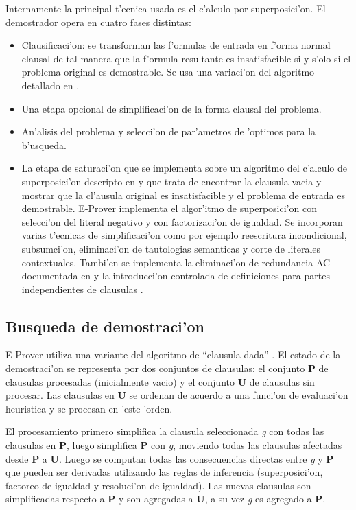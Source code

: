 Internamente la principal t'ecnica usada es el c'alculo por superposici'on. El demostrador opera en cuatro fases distintas:
\begin{itemize}
\item Clausificaci'on: se transforman las f'ormulas de entrada en f'orma normal clausal de tal manera que la f'ormula resultante es insatisfacible si y s'olo si el problema original es demostrable. Se usa una variaci'on del algoritmo detallado en \cite{smallcnf2001}.

\item Una etapa opcional de simplificaci'on de la forma clausal del problema.

\item An'alisis del problema y selecci'on de par'ametros de 'optimos para la b'usqueda.

\item La etapa de saturaci'on que se implementa sobre un algoritmo del c'alculo de superposici'on descripto en \cite{bg94} y \cite{aicom2002} que trata de encontrar la clausula vacia y mostrar que la cl'ausula original es insatisfacible y el problema de entrada es demostrable. E-Prover implementa el algor'itmo de superposici'on con selecci'on del literal negativo y con factorizaci'on de igualdad. Se incorporan varias t'ecnicas de simplificaci'on como por ejemplo reescritura incondicional, subsumci'on, eliminaci'on de tautologias semanticas y corte de literales contextuales. Tambi'en se implementa la eliminaci'on de redundancia AC documentada en \cite{jsc2003} y la introducci'on controlada de definiciones para partes independientes de clausulas \cite{ijcai2001}.
\end{itemize}

\subsection{Busqueda de demostraci'on}

E-Prover utiliza una variante del algoritmo de ``clausula dada'' \cite{dk97}. El estado de la demostraci'on se representa por dos conjuntos de clausulas: el conjunto \textbf{P} de clausulas procesadas (inicialmente vacio) y el conjunto \textbf{U} de clausulas sin procesar. Las clausulas en \textbf{U} se ordenan de acuerdo a una funci'on de evaluaci'on heuristica y se procesan en 'este 'orden.

El procesamiento primero simplifica la clausula seleccionada \textit{g} con todas las clausulas en \textbf{P}, luego simplifica \textbf{P} con \textit{g}, moviendo todas las clausulas afectadas desde \textbf{P} a \textbf{U}. Luego se computan todas las consecuencias directas entre \textit{g} y \textbf{P} que pueden ser derivadas utilizando las reglas de inferencia (superposici'on, factoreo de igualdad y resoluci'on de igualdad). Las nuevas clausulas son simplificadas respecto a \textbf{P} y son agregadas a \textbf{U}, a su vez \textit{g} es agregado a \textbf{P}.

